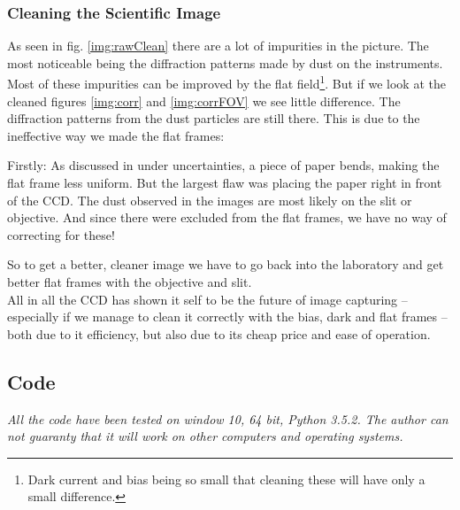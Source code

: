 \documentclass{emulateapj}
\begin{document}
\subsubsection{Cleaning the Scientific Image}
\label{sec:disClean}
As seen in fig. \ref{img:rawClean} there are a lot of impurities in the picture. The most noticeable being the diffraction patterns made by dust on the instruments. Most of these impurities can be improved by the flat field\footnote{Dark current and bias being so small that cleaning these will have only a small difference.}. But if we look at the cleaned figures \ref{img:corr} and \ref{img:corrFOV} we see little difference. The diffraction patterns from the dust particles are still there. This is due to the ineffective way we made the flat frames:

Firstly: As discussed in under uncertainties, a piece of paper bends, making the flat frame less uniform. But the largest flaw was placing the paper right in front of the CCD. The dust observed in the images are most likely on the slit or objective. And since there were excluded from the flat frames, we have no way of correcting for these!

So to get a better, cleaner image we have to go back into the laboratory and get better flat frames with the objective and slit.\\

All in all the CCD has shown it self to be the future of image capturing -- especially if we manage to clean it correctly with the bias, dark and flat frames -- both due to it efficiency, but also due to its cheap price and ease of operation.






\begin{widetext}
\newpage
\section{Code}
\label{sec:code}
\textit{All the code have been tested on window 10, 64 bit, Python 3.5.2. The author can not guaranty that it will work on other computers and operating systems.}

\end{widetext}
\end{document}
